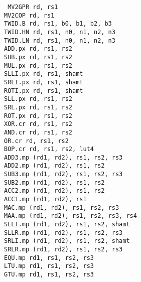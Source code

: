 {\tt
MV2GPR      rd, rs1                 \\
MV2COP      rd, rs1                 \\
TWID.B      rd, rs1, b0, b1, b2, b3 \\
TWID.HN     rd, rs1, n0, n1, n2, n3 \\
TWID.LN     rd, rs1, n0, n1, n2, n3 \\
ADD.px      rd, rs1, rs2            \\
SUB.px      rd, rs1, rs2            \\
MUL.px      rd, rs1, rs2            \\
SLLI.px     rd, rs1, shamt          \\
SRLI.px     rd, rs1, shamt          \\
ROTI.px     rd, rs1, shamt          \\
SLL.px      rd, rs1, rs2            \\
SRL.px      rd, rs1, rs2            \\
ROT.px      rd, rs1, rs2            \\
XOR.cr      rd, rs1, rs2            \\
AND.cr      rd, rs1, rs2            \\
OR.cr       rd, rs1, rs2            \\
BOP.cr      rd, rs1, rs2, lut4      \\
ADD3.mp     (rd1, rd2),  rs1, rs2, rs3 \\
ADD2.mp     (rd1, rd2),  rs1, rs2  \\
SUB3.mp     (rd1, rd2),  rs1, rs2, rs3 \\
SUB2.mp     (rd1, rd2),  rs1, rs2  \\
ACC2.mp     (rd1, rd2),  rs1, rs2  \\
ACC1.mp     (rd1, rd2),  rs1       \\
MAC.mp      (rd1, rd2),  rs1, rs2, rs3 \\
MAA.mp      (rd1, rd2),  rs1, rs2, rs3, rs4 \\
SLLI.mp     (rd1, rd2),  rs1, rs2, shamt \\
SLLR.mp     (rd1, rd2),  rs1, rs2, rs3 \\
SRLI.mp     (rd1, rd2),  rs1, rs2, shamt \\
SRLR.mp     (rd1, rd2),  rs1, rs2, rs3 \\
EQU.mp      rd1,         rs1, rs2, rs3 \\
LTU.mp      rd1,         rs1, rs2, rs3 \\
GTU.mp      rd1,         rs1, rs2, rs3 \\
}
